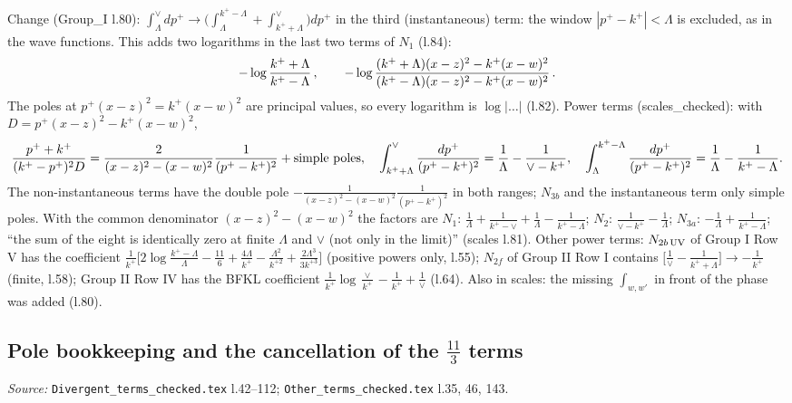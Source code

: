 \documentclass[10pt]{article}
\begin{document}
\noindent Change (Group\_I l.80): $\int_{\Lambda}^{\vee}dp^{+}\to\big(\int_{\Lambda}^{k^{+}-\Lambda}+\int_{k^{+}+\Lambda}^{\vee}\big)dp^{+}$ in the third (instantaneous) term: the window $|p^{+}-k^{+}|<\Lambda$ is excluded, as in the wave functions. This adds two logarithms in the last two terms of $N_{1}$ (l.84):
\begin{align}
-\log\frac{k^{+}+\Lambda}{k^{+}-\Lambda}\,,\qquad -\log\frac{(k^{+}+\Lambda)(x-z)^{2}-k^{+}(x-w)^{2}}{(k^{+}-\Lambda)(x-z)^{2}-k^{+}(x-w)^{2}}\,.\notag
\end{align}
The poles at $p^{+}(x-z)^{2}=k^{+}(x-w)^{2}$ are principal values, so every logarithm is $\log|\dots|$ (l.82). Power terms (scales\_checked): with $D=p^{+}(x-z)^{2}-k^{+}(x-w)^{2}$,
\begin{align}
\frac{p^{+}+k^{+}}{(k^{+}-p^{+})^{2}D}=\frac{2}{(x-z)^{2}-(x-w)^{2}}\frac{1}{(p^{+}-k^{+})^{2}}+\text{simple poles},\quad
\int_{k^{+}+\Lambda}^{\vee}\frac{dp^{+}}{(p^{+}-k^{+})^{2}}=\frac1\Lambda-\frac{1}{\vee-k^{+}},\quad\int_{\Lambda}^{k^{+}-\Lambda}\frac{dp^{+}}{(p^{+}-k^{+})^{2}}=\frac1\Lambda-\frac{1}{k^{+}-\Lambda}.\notag
\end{align}
The non-instantaneous terms have the double pole $-\frac{1}{(x-z)^{2}-(x-w)^{2}}\frac{1}{(p^{+}-k^{+})^{2}}$ in both ranges; $N_{3b}$ and the instantaneous term only simple poles. With the common denominator $(x-z)^{2}-(x-w)^{2}$ the factors are $N_{1}$: $\frac1\Lambda+\frac{1}{k^{+}-\vee}+\frac1\Lambda-\frac{1}{k^{+}-\Lambda}$; $N_{2}$: $\frac{1}{\vee-k^{+}}-\frac1\Lambda$; $N_{3a}$: $-\frac1\Lambda+\frac{1}{k^{+}-\Lambda}$; ``the sum of the eight is identically zero at finite $\Lambda$ and $\vee$ (not only in the limit)'' (scales l.81). Other power terms: $N_{2b\,\rm UV}$ of Group I Row V has the coefficient $\frac{1}{k^{+}}\big[2\log\frac{k^{+}-\Lambda}{\Lambda}-\frac{11}{6}+\frac{4\Lambda}{k^{+}}-\frac{\Lambda^{2}}{k^{+2}}+\frac{2\Lambda^{3}}{3k^{+3}}\big]$ (positive powers only, l.55); $N_{2f}$ of Group II Row I contains $\big[\frac1\vee-\frac{1}{k^{+}+\Lambda}\big]\to-\frac{1}{k^{+}}$ (finite, l.58); Group II Row IV has the BFKL coefficient $\frac{1}{k^{+}}\log\frac{\vee}{k^{+}}-\frac{1}{k^{+}}+\frac1\vee$ (l.64). Also in scales: the missing $\int_{w,w'}$ in front of the phase was added (l.80).

\subsection{Pole bookkeeping and the cancellation of the $\frac{11}{3}$ terms}\label{sec:calc-poles}
\noindent\emph{Source:} \texttt{Divergent\_terms\_checked.tex} l.42--112; \texttt{Other\_terms\_checked.tex} l.35, 46, 143.
\end{document}
